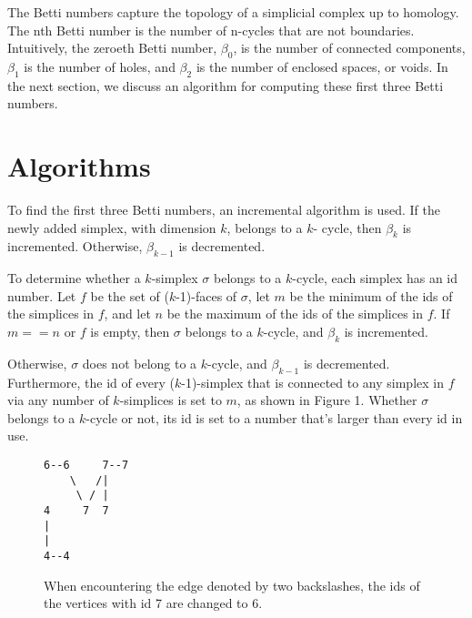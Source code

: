 \documentclass{article}
\begin{document}
The Betti numbers capture the topology of a simplicial complex up to
homology.  The nth Betti number is the number of n-cycles that are
not boundaries.  Intuitively, the zeroeth Betti number, $\beta_0$,
is the number of connected components, $\beta_1$ is the number of
holes, and $\beta_2$ is the number of enclosed spaces, or voids.
In the next section, we discuss an algorithm for computing these
first three Betti numbers.

\section{Algorithms}

To find the first three Betti numbers, an incremental algorithm
\cite{delfinado,zomor} is used. If the newly added simplex,
with dimension $k$, belongs to a $k$- cycle, then $\beta_k$ is
incremented.  Otherwise, $\beta_{k-1}$ is decremented.

To determine whether a $k$-simplex $\sigma$ belongs to a $k$-cycle,
each simplex has an id number.
Let $f$ be the set of ($k$-1)-faces of $\sigma$,
let $m$ be the minimum of the ids of the simplices in $f$, and let
$n$ be the maximum of the ids of the simplices in $f$.
If \(m == n\) or $f$ is empty, then $\sigma$ belongs to a $k$-cycle,
and $\beta_k$ is incremented.

Otherwise, $\sigma$ does not belong to a $k$-cycle, and $\beta_{k-1}$
is decremented. Furthermore, the id of every ($k$-1)-simplex that is
connected to
any simplex in $f$ via any number of $k$-simplices is set to $m$,
as shown in Figure 1.
Whether $\sigma$ belongs to a $k$-cycle or not, its id is set to
a number that's larger than every id in use.


\begin{figure}
\begin{verbatim}
6--6     7--7
    \   /|
     \ / |
4     7  7
|
|
4--4
\end{verbatim}
\caption{When encountering the edge denoted by two backslashes,
the ids of the vertices with id 7 are changed to 6.}
\end{figure}
\end{document}

